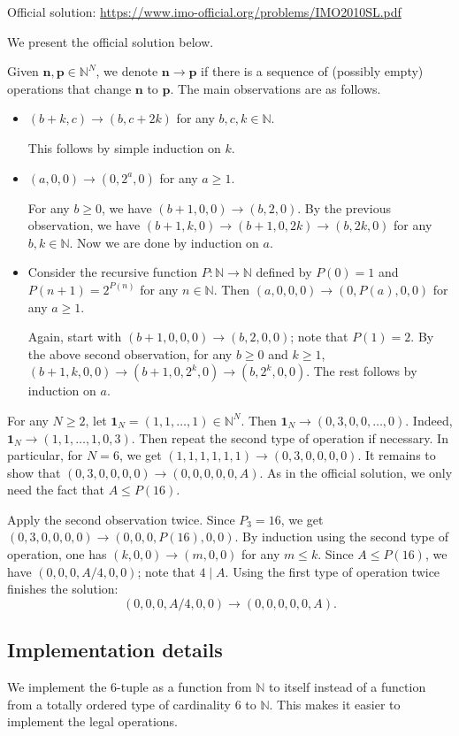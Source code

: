 \documentclass{article}
\newcommand{\N}{\mathbb{N}}
\begin{document}
Official solution: \url{https://www.imo-official.org/problems/IMO2010SL.pdf}

We present the official solution below.

Given $\mathbf{n}, \mathbf{p} \in \N^N$, we denote $\mathbf{n} \to \mathbf{p}$ if there is a sequence of (possibly empty) operations that change $\mathbf{n}$ to $\mathbf{p}$.
The main observations are as follows.

\begin{itemize}

    \item
    $(b + k, c) \to (b, c + 2k)$ for any $b, c, k \in \N$.

    This follows by simple induction on $k$.

    \item
    $(a, 0, 0) \to (0, 2^a, 0)$ for any $a \geq 1$.

    For any $b \geq 0$, we have $(b + 1, 0, 0) \to (b, 2, 0)$.
    By the previous observation, we have $(b + 1, k, 0) \to (b + 1, 0, 2k) \to (b, 2k, 0)$ for any $b, k \in \N$.
    Now we are done by induction on $a$.

    \item
    Consider the recursive function $P : \N \to \N$ defined by $P(0) = 1$ and $P(n + 1) = 2^{P(n)}$ for any $n \in \N$.
    Then $(a, 0, 0, 0) \to (0, P(a), 0, 0)$ for any $a \geq 1$.

    Again, start with $(b + 1, 0, 0, 0) \to (b, 2, 0, 0)$; note that $P(1) = 2$.
    By the above second observation, for any $b \geq 0$ and $k \geq 1$, $(b + 1, k, 0, 0) \to (b + 1, 0, 2^k, 0) \to (b, 2^k, 0, 0)$.
    The rest follows by induction on $a$.

\end{itemize}

For any $N \geq 2$, let $\mathbf{1}_N = (1, 1, \ldots, 1) \in \N^N$.
Then $\mathbf{1}_N \to (0, 3, 0, 0, \ldots, 0)$.
Indeed, $\mathbf{1}_N \to (1, 1, \ldots, 1, 0, 3)$.
Then repeat the second type of operation if necessary.
In particular, for $N = 6$, we get $(1, 1, 1, 1, 1, 1) \to (0, 3, 0, 0, 0, 0)$.
It remains to show that $(0, 3, 0, 0, 0, 0) \to (0, 0, 0, 0, 0, A)$.
As in the official solution, we only need the fact that $A \leq P(16)$.

Apply the second observation twice.
Since $P_3 = 16$, we get $(0, 3, 0, 0, 0, 0) \to (0, 0, 0, P(16), 0, 0)$.
By induction using the second type of operation, one has $(k, 0, 0) \to (m, 0, 0)$ for any $m \leq k$.
Since $A \leq P(16)$, we have $(0, 0, 0, A/4, 0, 0)$; note that $4 \mid A$.
Using the first type of operation twice finishes the solution:
\[ (0, 0, 0, A/4, 0, 0) \to (0, 0, 0, 0, 0, A). \]



\subsection*{Implementation details}

We implement the $6$-tuple as a function from $\N$ to itself instead of a function from a totally ordered type of cardinality $6$ to $\N$.
This makes it easier to implement the legal operations.
\end{document}
